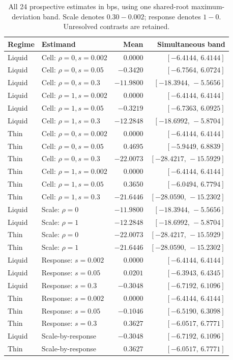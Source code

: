 \begin{table}[t]\centering\small
\begin{tabular}{llrr}\toprule
Regime & Estimand & Mean & Simultaneous band \\
\midrule
Liquid & Cell: $\rho=0, s=0.002$ & $0.0000$ & $[-6.4144,\,6.4144]$ \\
Liquid & Cell: $\rho=0, s=0.05$ & $-0.3420$ & $[-6.7564,\,6.0724]$ \\
Liquid & Cell: $\rho=0, s=0.3$ & $-11.9800$ & $[-18.3944,\,-5.5656]$ \\
Liquid & Cell: $\rho=1, s=0.002$ & $0.0000$ & $[-6.4144,\,6.4144]$ \\
Liquid & Cell: $\rho=1, s=0.05$ & $-0.3219$ & $[-6.7363,\,6.0925]$ \\
Liquid & Cell: $\rho=1, s=0.3$ & $-12.2848$ & $[-18.6992,\,-5.8704]$ \\
Thin & Cell: $\rho=0, s=0.002$ & $0.0000$ & $[-6.4144,\,6.4144]$ \\
Thin & Cell: $\rho=0, s=0.05$ & $0.4695$ & $[-5.9449,\,6.8839]$ \\
Thin & Cell: $\rho=0, s=0.3$ & $-22.0073$ & $[-28.4217,\,-15.5929]$ \\
Thin & Cell: $\rho=1, s=0.002$ & $0.0000$ & $[-6.4144,\,6.4144]$ \\
Thin & Cell: $\rho=1, s=0.05$ & $0.3650$ & $[-6.0494,\,6.7794]$ \\
Thin & Cell: $\rho=1, s=0.3$ & $-21.6446$ & $[-28.0590,\,-15.2302]$ \\
Liquid & Scale: $\rho=0$ & $-11.9800$ & $[-18.3944,\,-5.5656]$ \\
Liquid & Scale: $\rho=1$ & $-12.2848$ & $[-18.6992,\,-5.8704]$ \\
Thin & Scale: $\rho=0$ & $-22.0073$ & $[-28.4217,\,-15.5929]$ \\
Thin & Scale: $\rho=1$ & $-21.6446$ & $[-28.0590,\,-15.2302]$ \\
Liquid & Response: $s=0.002$ & $0.0000$ & $[-6.4144,\,6.4144]$ \\
Liquid & Response: $s=0.05$ & $0.0201$ & $[-6.3943,\,6.4345]$ \\
Liquid & Response: $s=0.3$ & $-0.3048$ & $[-6.7192,\,6.1096]$ \\
Thin & Response: $s=0.002$ & $0.0000$ & $[-6.4144,\,6.4144]$ \\
Thin & Response: $s=0.05$ & $-0.1046$ & $[-6.5190,\,6.3098]$ \\
Thin & Response: $s=0.3$ & $0.3627$ & $[-6.0517,\,6.7771]$ \\
Liquid & Scale-by-response & $-0.3048$ & $[-6.7192,\,6.1096]$ \\
Thin & Scale-by-response & $0.3627$ & $[-6.0517,\,6.7771]$ \\
\bottomrule\end{tabular}
\caption{All 24 prospective estimates in bps, using one shared-root maximum-deviation band. Scale denotes $0.30-0.002$; response denotes $1-0$. Unresolved contrasts are retained.}\label{tab:all24}
\end{table}
